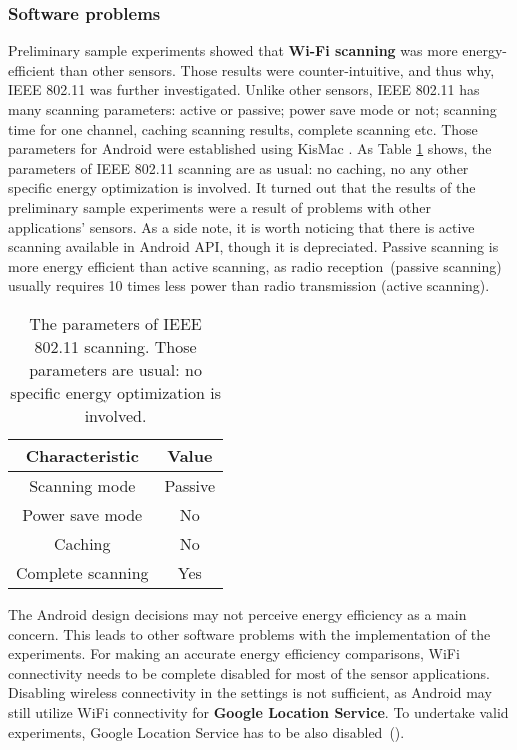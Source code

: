 \subsubsection{Software problems}
\hspace{10pt} Preliminary sample experiments showed that \textbf{Wi-Fi scanning} was more energy-efficient than other sensors. Those results were counter-intuitive, and thus why, IEEE 802.11 was further investigated. Unlike other sensors, IEEE 802.11 has many scanning parameters: active or passive; power save mode or not; scanning time for one channel, caching scanning results, complete scanning etc. Those parameters for Android were established using KisMac \cite{kismac:kismac}. As Table \ref{table:wifiparameters} shows, the parameters of IEEE 802.11 scanning are as usual: no caching, no any other specific energy optimization is involved. It turned out that the results of the preliminary sample experiments were a result of problems with other applications' sensors. As a side note, it is worth noticing that there is active scanning available in Android API, though it is depreciated. Passive scanning is more energy efficient than active scanning, as radio reception\ (passive scanning) usually requires 10 times less power than radio transmission (active scanning).

\begin{table}[H]
\centering
    \begin{tabular}{| c | c |}
    \hline
    	Characteristic & Value \\ \hline
    	Scanning mode & Passive \\ \hline
    	Power save mode & No \\ \hline
    	Caching & No \\ \hline
    	Complete scanning & Yes \\ \hline
    \end{tabular}
    \caption{The parameters of IEEE 802.11 scanning. Those parameters are usual: no specific energy optimization is involved.}
	\label{table:wifiparameters}
\end{table}


The Android design decisions may not perceive energy efficiency as a main concern. This leads to other software problems with the implementation of the experiments. For making an accurate energy efficiency comparisons, WiFi connectivity needs to be complete disabled for most of the sensor applications. Disabling wireless connectivity in the settings is not sufficient, as Android may still utilize WiFi connectivity for \textbf{Google Location Service}. To undertake valid experiments, Google Location Service has to be also disabled\ (). 

